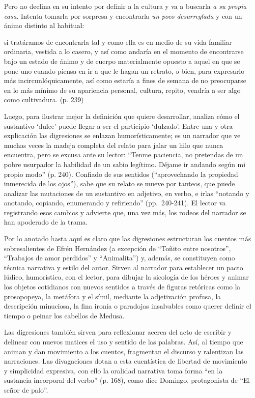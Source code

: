 \documentclass[14pt,twoside,final]{extbook} %
\begin{document}
Pero no declina en su intento por definir a la cultura y va a buscarla \emph{a su propia casa}. Intenta tomarla por sorpresa y encontrarla \emph{un poco desarreglada} y con un ánimo distinto al habitual:
\begin{quoting}
si tratáramos de encontrarla tal y como ella es en medio de su vida familiar ordinaria, vestida a lo casero, y así como andaría en el momento de encontrarse bajo un estado de ánimo y de cuerpo materialmente opuesto a aquel en que se pone uno cuando piensa en ir a que le hagan un retrato, o bien, para expresarlo más incircunlóquicamente, así como estaría a fines de semana de no preocuparse en lo más mínimo de su apariencia personal, cultura, repito, vendría a ser algo como cultivadura. (p. 239)
\end{quoting}
Luego, para ilustrar mejor la definición que quiere desarrollar, analiza cómo el sustantivo `dulce' puede llegar a ser el participio `dulzado'. Entre una y otra explicación las digresiones se enlazan
humorísticamente; es un narrador que ve muchas veces la madeja completa del relato para jalar un hilo que nunca encuentra, pero se excusa ante su lector: ``Tenme paciencia, no pretendas de un pobre usurpador la habilidad de un sabio legítimo. Déjame ir andando según mi propio modo'' (p. 240). Confiado de sus sentidos (``aprovechando la propiedad inmerecida de los ojos''), sabe que su relato se mueve por tanteos, que puede analizar las mutaciones de un sustantivo en adjetivo, en verbo, e irlas ``notando y anotando, copiando, enumerando y refiriendo'' (pp.~\mbox{240-241}). El lector va registrando esos cambios y advierte que, una vez más, los rodeos del narrador se han apoderado de la trama.

Por lo anotado hasta aquí es claro que las digresiones estructuran los cuentos más sobresalientes de Efrén Hernández (a excepción de ``Toñito entre nosotros'', ``Trabajos de amor perdidos'' y ``Animalita'') y, además, se constituyen como técnica narrativa y estilo del autor. Sirven al narrador para establecer un pacto lúdico, humorístico, con el lector, para dibujar la sicología de los héroes y animar los objetos cotidianos con nuevos sentidos a través de figuras retóricas como la prosopopeya, la metáfora y el símil, mediante la adjetivación profusa, la descripción minuciosa, la fina ironía o paradojas insalvables como querer definir el tiempo o peinar los cabellos de Medusa.

Las digresiones también sirven para reflexionar acerca del acto de escribir y delinear con nuevos matices el uso y sentido de las palabras. Así, al tiempo que animan y dan movimiento a los cuentos, fragmentan el discurso y ralentizan las narraciones. Las divagaciones dotan a esta cuentística de libertad de movimiento y simplicidad expresiva, con ello la oralidad narrativa toma forma ``en la sustancia incorporal del verbo'' (p. 168), como dice Domingo, protagonista de ``El señor de palo''.
\end{document}
